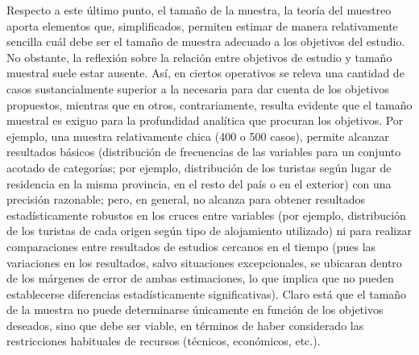 \documentclass[
]{book}
\begin{document}
Respecto a este último punto, el tamaño de la muestra, la teoría del muestreo aporta elementos que, simplificados, permiten estimar de manera relativamente sencilla cuál debe ser el tamaño de muestra adecuado a los objetivos del estudio. No obstante, la reflexión sobre la relación entre objetivos de estudio y tamaño muestral suele estar ausente. Así, en ciertos operativos se releva una cantidad de casos sustancialmente superior a la necesaria para dar cuenta de los objetivos propuestos, mientras que en otros, contrariamente, resulta evidente que el tamaño muestral es exiguo para la profundidad analítica que procuran los objetivos. Por ejemplo, una muestra relativamente chica (400 o 500 casos), permite alcanzar resultados básicos (distribución de frecuencias de las variables para un conjunto acotado de categorías; por ejemplo, distribución de los turistas según lugar de residencia en la misma provincia, en el resto del país o en el exterior) con una precisión razonable; pero, en general, no alcanza para obtener resultados estadísticamente robustos en los cruces entre variables (por ejemplo, distribución de los turistas de cada origen según tipo de alojamiento utilizado) ni para realizar comparaciones entre resultados de estudios cercanos en el tiempo (pues las variaciones en los resultados, salvo situaciones excepcionales, se ubicaran dentro de los márgenes de error de ambas estimaciones, lo que implica que no pueden establecerse diferencias estadísticamente significativas). Claro está que el tamaño de la muestra no puede determinarse únicamente en función de los objetivos deseados, sino que debe ser viable, en términos de haber considerado las restricciones habituales de recursos (técnicos, económicos, etc.).
\end{document}
